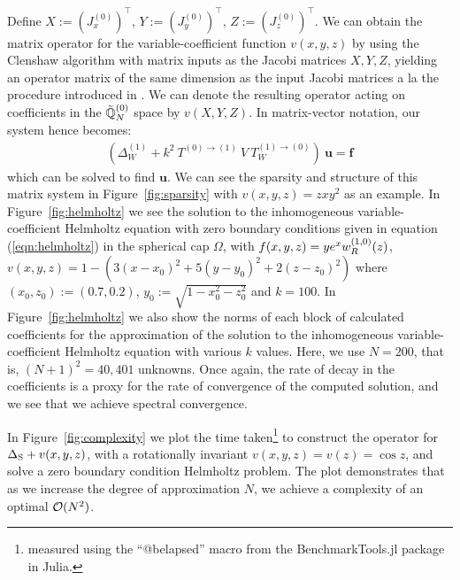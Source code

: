 \documentclass[11pt, oneside]{article}   	%
\begin{document}
Define $X := (J_x^{(0)})^\top$, $Y := (J_y^{(0)})^\top$, $Z := (J_z^{(0)})^\top$. We can obtain the matrix operator for the variable-coefficient function $v(x,y,z)$ by using the Clenshaw algorithm with matrix inputs as the Jacobi matrices $X, Y, Z$, yielding an operator matrix of the same dimension as the input Jacobi matrices a la the procedure introduced in \cite{olver2019triangle}. We can denote the resulting operator acting on coefficients in the ${\mathbb{\tilde Q}}^{(0)}_{N}$ space by $v(X, Y, Z)$. In matrix-vector notation, our system hence becomes:
\begin{align*}
    (\Delta_W^{(1)} + k^2 \:T^{(0)\to(1)} \: V \: T_W^{(1)\to(0)}) \: \mathbf{u} = \mathbf{f}
\end{align*}
which can be solved to find $\mathbf{u}$. We can see the sparsity and structure of this matrix system in Figure~\ref{fig:sparsity} with $v(x,y,z) = zxy^2$ as an example. In Figure~\ref{fig:helmholtz} we see the solution to the inhomogeneous variable-coefficient Helmholtz equation with zero boundary conditions given in equation (\ref{eqn:helmholtz}) in the spherical cap $\Omega$, with $f(x,y,z) = y e^x w_R^{(1,0)}(z)$, $v(x,y,z) = 1 - (3(x-x_0)^2 + 5(y-y_0)^2 + 2(z-z_0)^2)$ where $(x_0, z_0) := (0.7, 0.2)$, $y_0 := \sqrt{1 - x_0^2 - z_0^2}$ and $k = 100$. In Figure~\ref{fig:helmholtz} we also show the norms of each block of calculated coefficients for the approximation of the solution to the inhomogeneous variable-coefficient Helmholtz equation with various $k$ values. Here, we use $N = 200$, that is, $(N+1)^2 = 40,401$ unknowns. Once again, the rate of decay in the coefficients is a proxy for the rate of convergence of the computed solution, and we see that we achieve spectral convergence.

In Figure~\ref{fig:complexity} we plot the time taken\footnote{measured using the \enquote{@belapsed} macro from the BenchmarkTools.jl package \cite{BenchmarkTools.jl-2016} in Julia.} to construct the operator for $\Delta_{\rm S} + v(x,y,z)$, with a rotationally invariant $v(x,y,z) = v(z) = \cos z$, and solve a zero boundary condition Helmholtz problem. The plot demonstrates that as we increase the degree of approximation $N$, we achieve a complexity of an optimal $\mathcal{O}(N^2)$.
\end{document}
